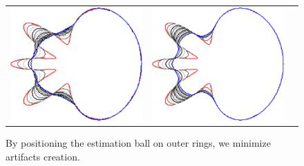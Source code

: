 \begin{figure}
\begin{tabular}{ccc}
\includegraphics[scale=0.22]{figures/chapter6/level-effect/flower/improve/len_pen0/radius-5/level4/summary.pdf} &
\includegraphics[scale=0.22]{figures/chapter6/level-effect/flower/improve/len_pen0/radius-5/level5/summary.pdf} 
\end{tabular}
\caption{ By positioning the estimation ball on outer rings, we minimize artifacts creation. %
}
\label{ch6:fig:mrings-r5-evolution}
\end{figure}


